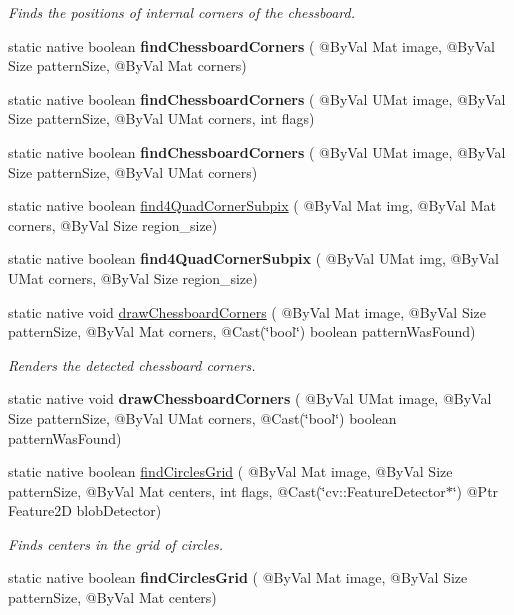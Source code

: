 \begin{DoxyCompactItemize}
\begin{DoxyCompactList}\small\item\em Finds the positions of internal corners of the chessboard. \end{DoxyCompactList}\item 
static native boolean {\bfseries find\+Chessboard\+Corners} ( @By\+Val Mat image, @By\+Val Size pattern\+Size, @By\+Val Mat corners)
\item 
static native boolean {\bfseries find\+Chessboard\+Corners} ( @By\+Val U\+Mat image, @By\+Val Size pattern\+Size, @By\+Val U\+Mat corners, int flags)
\item 
static native boolean {\bfseries find\+Chessboard\+Corners} ( @By\+Val U\+Mat image, @By\+Val Size pattern\+Size, @By\+Val U\+Mat corners)
\item 
static native boolean \hyperlink{group__calib3d_ga10b6a054de67db7ef3a290871688b660}{find4\+Quad\+Corner\+Subpix} ( @By\+Val Mat img, @By\+Val Mat corners, @By\+Val Size region\+\_\+size)
\item 
static native boolean {\bfseries find4\+Quad\+Corner\+Subpix} ( @By\+Val U\+Mat img, @By\+Val U\+Mat corners, @By\+Val Size region\+\_\+size)
\item 
static native void \hyperlink{group__calib3d_ga71d497eb4a9eead84d1e4522d54ed580}{draw\+Chessboard\+Corners} ( @By\+Val Mat image, @By\+Val Size pattern\+Size, @By\+Val Mat corners, @Cast(\char`\"{}bool\char`\"{}) boolean pattern\+Was\+Found)
\begin{DoxyCompactList}\small\item\em Renders the detected chessboard corners. \end{DoxyCompactList}\item 
static native void {\bfseries draw\+Chessboard\+Corners} ( @By\+Val U\+Mat image, @By\+Val Size pattern\+Size, @By\+Val U\+Mat corners, @Cast(\char`\"{}bool\char`\"{}) boolean pattern\+Was\+Found)
\item 
static native boolean \hyperlink{group__calib3d_ga150470ce16ca1879fd1809729801803b}{find\+Circles\+Grid} ( @By\+Val Mat image, @By\+Val Size pattern\+Size, @By\+Val Mat centers, int flags, @Cast(\char`\"{}cv\+::\+Feature\+Detector$\ast$\char`\"{}) @Ptr Feature2D blob\+Detector)
\begin{DoxyCompactList}\small\item\em Finds centers in the grid of circles. \end{DoxyCompactList}\item 
static native boolean {\bfseries find\+Circles\+Grid} ( @By\+Val Mat image, @By\+Val Size pattern\+Size, @By\+Val Mat centers)

\end{DoxyCompactItemize}
